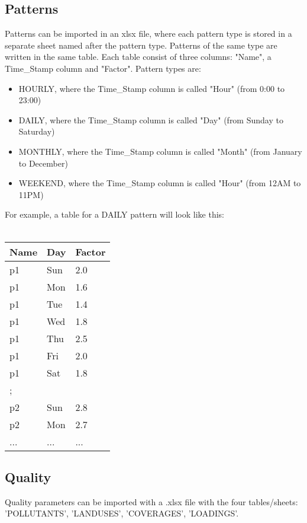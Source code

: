 \documentclass[10pt,a4paper,oneside]{scrbook}
\begin{document}
\subsection{Patterns}
Patterns can be imported in an xlsx file, 
where each pattern type is stored in a separate sheet named after the pattern type. Patterns of the same type are written in the same table. Each table consist of three columns: "Name", a Time\_Stamp column and "Factor". Pattern types are:
\begin{itemize}
	\setlength\itemsep{0pt}
	\item HOURLY, where the Time\_Stamp column is called "Hour" (from 0:00 to 23:00)
	\item DAILY, where the Time\_Stamp column is called "Day" (from Sunday to Saturday)
	\item MONTHLY, where the Time\_Stamp column is called "Month" (from January to December)
	\item WEEKEND, where the Time\_Stamp column is called "Hour" (from 12AM to 11PM)
\end{itemize}
For example, a table for a DAILY pattern will look like this:\\
\\
\begin{tabular}{|p{1.7cm}|p{2.4cm}|P{1.3cm}|}
\hline 
\textbf{Name} & \textbf{Day} & \textbf{Factor}\\ 
\hline 
p1 & Sun & 2.0 \\
\hline 
p1 & Mon & 1.6 \\
\hline 
p1 & Tue & 1.4 \\
\hline 
p1 & Wed & 1.8 \\
\hline 
p1 & Thu & 2.5 \\
\hline 
p1 & Fri & 2.0 \\
\hline 
p1 & Sat & 1.8 \\
\hline 
; &  &   \\
\hline 
p2 & Sun & 2.8 \\ 
\hline 
p2 & Mon & 2.7  \\
\hline 
... & ... & ... \\
\hline
\end{tabular}

\subsection{Quality}
Quality parameters can be imported with a .xlsx file with the four tables/sheets: 'POLLUTANTS', 'LANDUSES', 'COVERAGES', 'LOADINGS'. 
\end{document}
